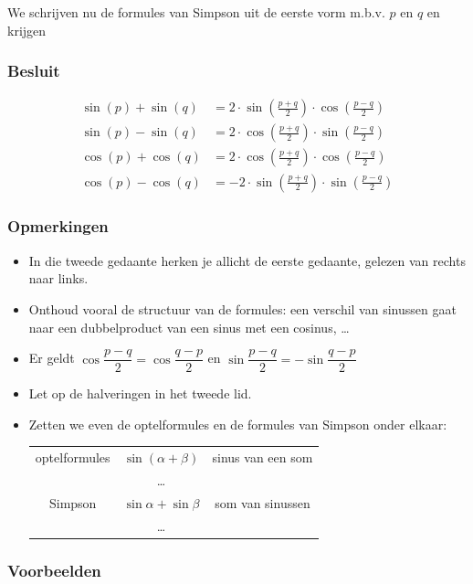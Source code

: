 \documentclass[a4paper,12pt]{article}
\begin{document}
We schrijven nu de formules van Simpson uit de eerste vorm m.b.v. $p$ en $q$ en krijgen

\subsubsection*{Besluit}
\begin{align*}
  \sin(p)+\sin(q) &= 2\cdot \sin(\frac{p+q}{2})\cdot \cos(\frac{p-q}{2})\\
  \sin(p)-\sin(q) &= 2\cdot \cos(\frac{p+q}{2})\cdot \sin(\frac{p-q}{2})\\
  \cos(p)+\cos(q) &= 2\cdot \cos(\frac{p+q}{2})\cdot \cos(\frac{p-q}{2})\\
  \cos(p)-\cos(q) &= -2\cdot \sin(\frac{p+q}{2})\cdot \sin(\frac{p-q}{2})
\end{align*}

\subsubsection*{Opmerkingen}
\begin{itemize}
  \item In die tweede gedaante herken je allicht de eerste gedaante, gelezen van rechts
naar links.
  \item Onthoud vooral de structuur van de formules: een verschil van sinussen gaat
naar een dubbelproduct van een sinus met een cosinus, \ldots
  \item Er geldt $\cos\dfrac{p-q}{2}=\cos\dfrac{q-p}{2}$ en $\sin\dfrac{p-q}{2}=-\sin\dfrac{q-p}{2}$
  \item Let op de halveringen in het tweede lid.
  \item Zetten we even de optelformules en de formules van Simpson onder elkaar:\\
\begin{tabular}{c|c|c}
optelformules & $\sin(\alpha + \beta)$ & sinus van een som\\
              & \ldots\\
Simpson & $\sin\alpha + \sin\beta$ & som van sinussen\\
              & \ldots\\
  
\end{tabular}
\end{itemize}

\subsubsection*{Voorbeelden}
\end{document}
